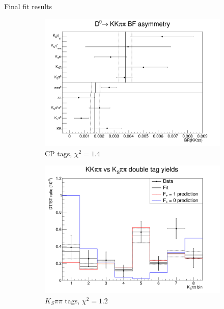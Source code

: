 \documentclass{beamer}
\begin{document}
\begin{frame}{Final fit results}
    \begin{figure}
    \centering
    \begin{subfigure}{0.34\textwidth}
      \centering
      \includegraphics[width=\textwidth]{Plots/CPeven_fraction_combination_CPtags.png}
      \caption{CP tags, $\chi^2 = 1.4$}
    \end{subfigure}
    \begin{subfigure}{0.33\textwidth}
      \centering
      \includegraphics[width=\textwidth]{Plots/CPeven_fraction_combination_KSpipi.png}
      \caption{$K_S\pi\pi$ tags, $\chi^2 = 1.2$}
    \end{subfigure}%
    \begin{subfigure}{0.33\textwidth}

\end{subfigure}
\end{figure}
\end{frame}
\end{document}
